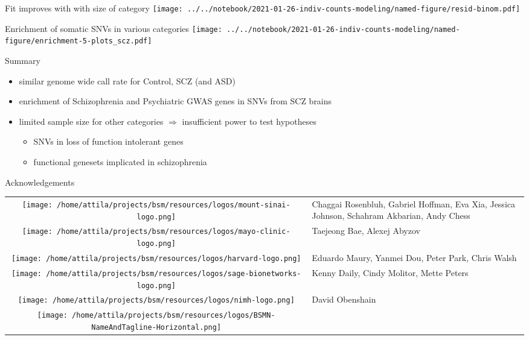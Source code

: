 \documentclass[usenames,dvipsnames]{beamer}
\begin{document}
\begin{frame}{Fit improves with with size of category}
\texttt{[image: ../../notebook/2021-01-26-indiv-counts-modeling/named-figure/resid-binom.pdf]}
\end{frame}

\begin{frame}{Enrichment of somatic SNVs in various categories}
\texttt{[image: ../../notebook/2021-01-26-indiv-counts-modeling/named-figure/enrichment-5-plots\_scz.pdf]}
\end{frame}

\begin{frame}{Summary}
\begin{itemize}
\item similar genome wide call rate for Control, SCZ (and ASD)
\item enrichment of Schizophrenia and Psychiatric GWAS genes in SNVs from
	SCZ brains
\item limited sample size for other categories \(\Rightarrow\) insufficient power to test
	hypotheses
\begin{itemize}
	\item SNVs in loss of function intolerant genes
        \item functional genesets implicated in schizophrenia
\end{itemize}
\end{itemize}
\end{frame}

\begin{frame}{Acknowledgements}
\footnotesize
\begin{tabular}{cp{3in}}
\parbox[c]{9em}{\texttt{[image: /home/attila/projects/bsm/resources/logos/mount-sinai-logo.png]}}
& Chaggai Rosenbluh, Gabriel Hoffman, Eva Xia, Jessica Johnson, Schahram Akbarian, Andy Chess \\
\noalign{\medskip}
\parbox[c]{9em}{\texttt{[image: /home/attila/projects/bsm/resources/logos/mayo-clinic-logo.png]}} & Taejeong Bae, Alexej Abyzov \\
\noalign{\medskip}
\parbox[c]{9em}{\texttt{[image: /home/attila/projects/bsm/resources/logos/harvard-logo.png]}}
& Eduardo Maury, Yanmei Dou, Peter Park, Chris Walsh \\
\noalign{\medskip}
\parbox[c]{9em}{\texttt{[image: /home/attila/projects/bsm/resources/logos/sage-bionetworks-logo.png]}} & Kenny Daily, Cindy Molitor, Mette Peters \\
\noalign{\medskip}
\parbox[c]{9em}{\texttt{[image: /home/attila/projects/bsm/resources/logos/nimh-logo.png]}}
& David Obenshain \\
\noalign{\medskip}
\parbox[c]{9em}{\texttt{[image: /home/attila/projects/bsm/resources/logos/BSMN-NameAndTagline-Horizontal.png]}}
& \\
\end{tabular}
\end{frame}
\end{document}
